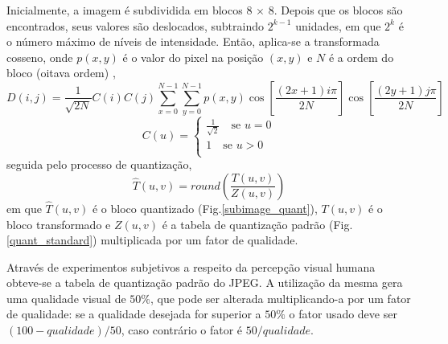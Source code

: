 Inicialmente, a imagem é subdividida em blocos 8 $\times$ 8. Depois que os blocos são encontrados, seus valores são deslocados, subtraindo $ 2^{k-1} $ unidades, em que $ 2^{k} $ é o número máximo de níveis de intensidade. Então, aplica-se a transformada cosseno, onde $ p(x,y) $ é o valor do pixel na posição $ (x,y) $ e $ N $ é a ordem do bloco (oitava ordem) \cite{cabeen1998image},
\begin{equation}
\label{dct_eq}
D(i,j) = \frac{1}{\sqrt{2N}} C(i)C(j) \sum\limits_{x=0}^{N-1} \sum\limits_{y=0}^{N-1} p(x,y) \cos \left[ \frac{(2x+1)i \pi}{2N} \right] \cos \left[ \frac{(2y+1)j \pi}{2N} \right]
\end{equation}
\begin{equation}
C(u) = \begin{cases}
\frac{1}{\sqrt{2}} \quad \textrm{se } u = 0 \\
1 \quad \textrm{se } u > 0 \\ 
\end{cases} 
\end{equation}
 seguida pelo processo de quantização,
\begin{equation}
\label{eq_quant}
\hat{T}(u,v) = round \left(\frac{T(u,v)}{Z(u,v)}\right)
\end{equation}
em que $ \hat{T}(u,v) $ é o bloco quantizado (Fig.\ref{subimage_quant}), $ T(u,v) $ é o bloco transformado e $ Z(u,v) $ é a tabela de quantização padrão (Fig.\ref{quant_standard}) multiplicada por um fator de qualidade.

Através de experimentos subjetivos a respeito da percepção visual humana obteve-se a tabela de quantização padrão do JPEG. A utilização da mesma gera uma qualidade visual de $ 50\% $, que pode ser alterada multiplicando-a por um fator de qualidade: se a qualidade desejada for superior a $ 50 \% $ o fator usado deve ser $ (100-qualidade)/50 $, caso contrário o fator é $ 50/qualidade $.

